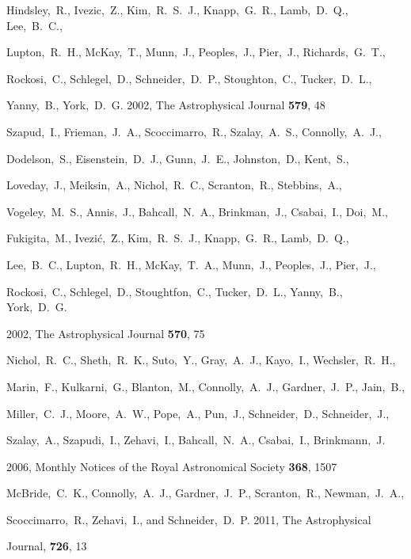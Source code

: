 \documentclass[prd,nofootbib,floatfix,11pt,tightenlines,nofootinbib]{revtex4}
\begin{document}
\begin{thebibliography}{99}
Hindsley,~R., Ivezic,~Z., Kim,~R.~S.~J., Knapp,~G.~R., Lamb,~D.~Q., Lee,~B.~C.,

Lupton,~R.~H., McKay,~T., Munn,~J., Peoples,~J., Pier,~J., Richards,~G.~T.,

Rockosi,~C., Schlegel,~D., Schneider,~D.~P., Stoughton,~C., Tucker,~D.~L.,

Yanny,~B., York,~D.~G. 2002, The Astrophysical Journal {\bf 579}, 48




Szapud,~I., Frieman,~J.~A., Scoccimarro,~R., Szalay,~A.~S., Connolly,~A.~J.,

Dodelson,~S., Eisenstein,~D.~J., Gunn,~J.~E., Johnston,~D., Kent,~S.,

Loveday,~J., Meiksin,~A., Nichol,~R.~C., Scranton,~R., Stebbins,~A.,

Vogeley,~M.~S., Annis,~J., Bahcall,~N.~A., Brinkman,~J., Csabai,~I., Doi,~M.,

Fukigita,~M., Ivezi\'c,~\u Z., Kim,~R.~S.~J., Knapp,~G.~R., Lamb,~D.~Q.,

Lee,~B.~C., Lupton,~R.~H., McKay,~T.~A., Munn,~J., Peoples,~J., Pier,~J.,

Rockosi,~C., Schlegel,~D., Stoughtfon,~C., Tucker,~D.~L., Yanny,~B., York,~D.~G.

2002, The Astrophysical Journal {\bf 570}, 75




Nichol,~R.~C., Sheth,~R.~K., Suto,~Y., Gray,~A.~J., Kayo,~I., Wechsler,~R.~H.,

Marin,~F., Kulkarni,~G., Blanton,~M., Connolly,~A.~J., Gardner,~J.~P., Jain,~B.,

Miller,~C.~J., Moore,~A.~W., Pope,~A., Pun,~J., Schneider,~D., Schneider,~J.,

Szalay,~A., Szapudi,~I., Zehavi,~I., Bahcall,~N.~A., Csabai,~I., Brinkmann,~J.

2006, Monthly Notices of the Royal Astronomical Society {\bf 368}, 1507




McBride,~C.~K., Connolly,~A.~J., Gardner,~J.~P., Scranton,~R., Newman,~J.~A.,

Scoccimarro,~R., Zehavi,~I., and Schneider,~D.~P. 2011, The Astrophysical

Journal, {\bf 726}, 13




\end{thebibliography}
\end{document}
